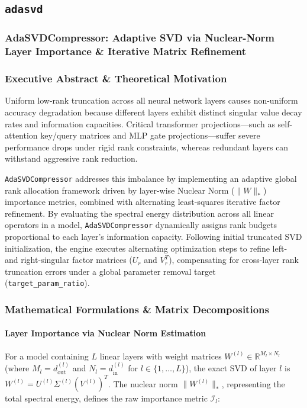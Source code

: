 \subsection{\texttt{adasvd}}
\subsubsection*{AdaSVDCompressor: Adaptive SVD via Nuclear-Norm Layer Importance \& Iterative Matrix Refinement}

\subsubsection*{Executive Abstract \& Theoretical Motivation}
Uniform low-rank truncation across all neural network layers causes non-uniform accuracy degradation because different layers exhibit distinct singular value decay rates and information capacities. Critical transformer projections---such as self-attention key/query matrices and MLP gate projections---suffer severe performance drops under rigid rank constraints, whereas redundant layers can withstand aggressive rank reduction.

\texttt{AdaSVDCompressor} addresses this imbalance by implementing an adaptive global rank allocation framework driven by layer-wise Nuclear Norm ($\|W\|_*$) importance metrics, combined with alternating least-squares iterative factor refinement. By evaluating the spectral energy distribution across all linear operators in a model, \texttt{AdaSVDCompressor} dynamically assigns rank budgets proportional to each layer's information capacity. Following initial truncated SVD initialization, the engine executes alternating optimization steps to refine left- and right-singular factor matrices ($U_r$ and $V_r^T$), compensating for cross-layer rank truncation errors under a global parameter removal target (\texttt{target\_param\_ratio}).


\subsubsection*{Mathematical Formulations \& Matrix Decompositions}

\paragraph{Layer Importance via Nuclear Norm Estimation}
For a model containing $L$ linear layers with weight matrices $W^{(l)} \in \mathbb{R}^{M_l \times N_l}$ (where $M_l = d_{\text{out}}^{(l)}$ and $N_l = d_{\text{in}}^{(l)}$ for $l \in \{1, \dots, L\}$), the exact SVD of layer $l$ is $W^{(l)} = U^{(l)} \Sigma^{(l)} (V^{(l)})^T$. The nuclear norm $\|W^{(l)}\|_*$, representing the total spectral energy, defines the raw importance metric $\mathcal{I}_l$:


